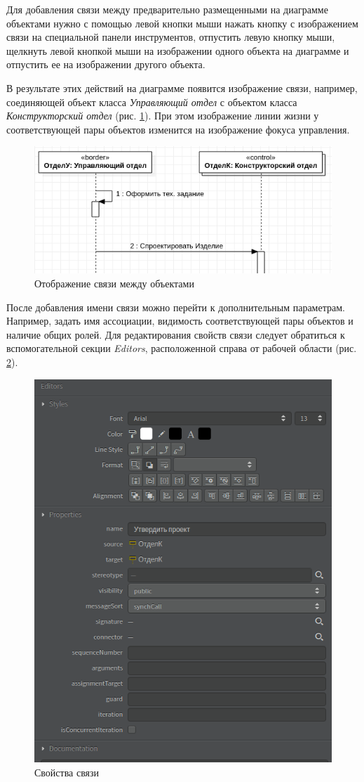 \documentclass[a4paper,12pt]{extreport}
\begin{document}
Для добавления связи между предварительно размещенными на диаграмме объектами нужно с помощью левой кнопки мыши нажать кнопку с изображением связи на специальной панели инструментов, отпустить левую кнопку мыши, щелкнуть левой кнопкой мыши на изображении одного объекта на диаграмме и отпустить ее на изображении другого объекта. 

В результате этих действий на диаграмме появится изображение связи, например, соединяющей объект класса \textit{Управляющий отдел} с объектом класса \textit{Конструкторский отдел} (рис. \ref{fig:sequenceaction1}). При этом изображение линии жизни у соответствующей пары объектов изменится на изображение фокуса управления.

\begin{figure}[h!]
	\centering
	\includegraphics[width=0.6\linewidth]{images/sequenceaction1}
	\caption{Отображение связи между объектами}
	\label{fig:sequenceaction1}
\end{figure}

После добавления имени связи можно перейти к дополнительным параметрам. Например, задать имя ассоциации, видимость соответствующей пары объектов и наличие общих ролей. Для редактирования свойств связи следует обратиться к вспомогательной секции \textit{Editors}, расположенной справа от рабочей области (рис. \ref{fig:sequenceeditors}).

\begin{figure}[h!]
	\centering
	\includegraphics[width=0.4\linewidth]{images/sequenceeditors}
	\caption{Свойства связи}
	\label{fig:sequenceeditors}
\end{figure}
\end{document}

